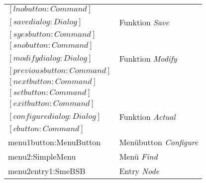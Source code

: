 \begin{tabular}{|l|l|}
\hspace{1.0cm}                        $[lnobutton:Command]$        &                                       \\
\hspace{0.5cm}                $[savedialog:Dialog]$                &     Funktion {\it Save}                    \\
\hspace{1.0cm}                        $[syesbutton:Command]$       &                                       \\
\hspace{1.0cm}                        $[snobutton:Command]$        &                                      \\
\hspace{0.5cm}                $[modifydialog:Dialog]$              &     Funktion {\it Modify}                 \\
\hspace{1.0cm}                        $[previousbutton:Command]$   &                                      \\
\hspace{1.0cm}                        $[nextbutton:Command]$       &                                      \\
\hspace{1.0cm}                        $[setbutton:Command]$        &                                       \\
\hspace{1.0cm}                        $[exitbutton:Command]$       &                                      \\
\hspace{0.5cm}                $[configuredialog:Dialog]$           &     Funktion {\it Actual}                  \\
\hspace{1.0cm}                        $[cbutton:Command]$          &                                      \\
\hspace{0.5cm}                menu1button:MenuButton             &     Men\"ubutton {\it Configure}          \\
\hspace{0.5cm}                menu2:SimpleMenu                   &     Men\"u {\it Find}                     \\
\hspace{1.0cm}                        menu2entry1:SmeBSB         &     Entry {\it Node}                       \\

\end{tabular}
